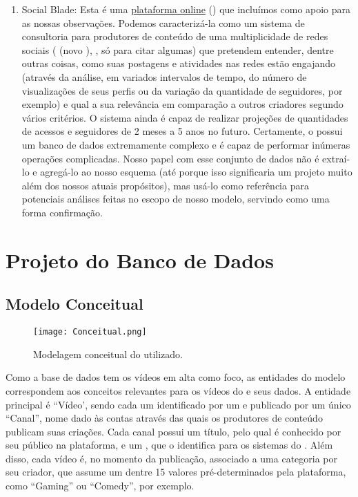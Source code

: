 \begin{enumerate}
  \item Social Blade: Esta é uma \href{https://socialblade.com/}{plataforma online} () que incluímos como apoio para as nossas observações. Podemos caracterizá-la como um sistema de consultoria para produtores de conteúdo de uma multiplicidade de redes sociais ( (novo ), , só para citar algumas) que pretendem entender, dentre outras coisas, como suas postagens e atividades nas redes estão engajando (através da análise, em variados intervalos de tempo, do número de visualizações de seus perfis ou da variação da quantidade de seguidores, por exemplo) e qual a sua relevância em comparação a outros criadores segundo vários critérios. O sistema ainda é capaz de realizar projeções de quantidades de acessos e seguidores de 2 meses a 5 anos no futuro. Certamente, o  possui um banco de dados extremamente complexo e é capaz de performar inúmeras operações complicadas. Nosso papel com esse conjunto de dados não é extraí-lo e agregá-lo ao nosso esquema (até porque isso significaria um projeto muito além dos nossos atuais propósitos), mas usá-lo como referência para potenciais análises feitas no escopo de nosso modelo, servindo como uma forma confirmação.
\end{enumerate} 


\chapter{Projeto do Banco de Dados}

\section{Modelo Conceitual}

  \vspace{2cm}
  \begin{figure}[H]
    \centering
    \texttt{[image: Conceitual.png]} 
    \caption{Modelagem conceitual do  utilizado.}
  \end{figure}

  Como a base de dados tem os vídeos em alta como foco, as entidades do modelo correspondem aos conceitos relevantes para os vídeos do  e seus dados. A entidade principal é ``Vídeo', sendo cada um identificado por um  e publicado por um único ``Canal'', nome dado às contas através das quais os produtores de conteúdo publicam suas criações. Cada canal possui um título, pelo qual é conhecido por seu público na plataforma, e um , que o identifica para os sistemas do . Além disso, cada vídeo é, no momento da publicação, associado a uma categoria por seu criador, que assume um dentre 15 valores pré-determinados pela plataforma, como ``Gaming'' ou ``Comedy'', por exemplo.

